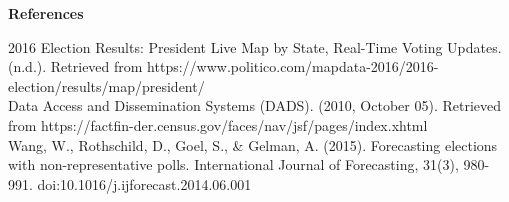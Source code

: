 \documentclass[12pt]{article}
\begin{document}
\newpage
\begin{center}
{\Large \textbf{References}}
\end{center}

\hangindent=0.7cm 2016 Election Results: President Live Map by State, Real-Time Voting Updates. (n.d.). Retrieved from https://www.politico.com/mapdata-2016/2016-election/results/map/president/\\

\hangindent=0.7cm Data Access and Dissemination Systems (DADS). (2010, October 05). Retrieved from https://factfin-der.census.gov/faces/nav/jsf/pages/index.xhtml\\

\hangindent=0.7cm Wang, W., Rothschild, D., Goel, S., \& Gelman, A. (2015). Forecasting elections with non-representative polls. International Journal of Forecasting, 31(3), 980-991. doi:10.1016/j.ijforecast.2014.06.001
\end{document}
